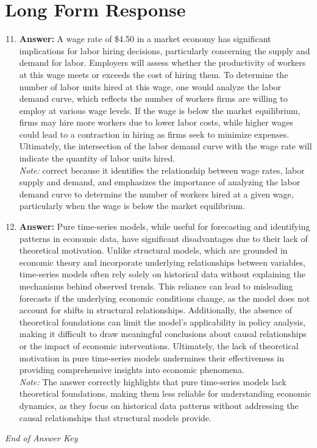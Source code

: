 \documentclass[12pt]{article}
\begin{document}
\section*{Long Form Response}
\begin{enumerate}[label=\arabic*.]
\setcounter{enumi}{10}
\item \textbf{Answer:} A wage rate of \$4.50 in a market economy has significant implications for labor hiring decisions, particularly concerning the supply and demand for labor. Employers will assess whether the productivity of workers at this wage meets or exceeds the cost of hiring them. To determine the number of labor units hired at this wage, one would analyze the labor demand curve, which reflects the number of workers firms are willing to employ at various wage levels. If the wage is below the market equilibrium, firms may hire more workers due to lower labor costs, while higher wages could lead to a contraction in hiring as firms seek to minimize expenses. Ultimately, the intersection of the labor demand curve with the wage rate will indicate the quantity of labor units hired.
\\ \textit{Note:} correct because it identifies the relationship between wage rates, labor supply and demand, and emphasizes the importance of analyzing the labor demand curve to determine the number of workers hired at a given wage, particularly when the wage is below the market equilibrium.
\item \textbf{Answer:} Pure time-series models, while useful for forecasting and identifying patterns in economic data, have significant disadvantages due to their lack of theoretical motivation. Unlike structural models, which are grounded in economic theory and incorporate underlying relationships between variables, time-series models often rely solely on historical data without explaining the mechanisms behind observed trends. This reliance can lead to misleading forecasts if the underlying economic conditions change, as the model does not account for shifts in structural relationships. Additionally, the absence of theoretical foundations can limit the model's applicability in policy analysis, making it difficult to draw meaningful conclusions about causal relationships or the impact of economic interventions. Ultimately, the lack of theoretical motivation in pure time-series models undermines their effectiveness in providing comprehensive insights into economic phenomena.
\\ \textit{Note:} The answer correctly highlights that pure time-series models lack theoretical foundations, making them less reliable for understanding economic dynamics, as they focus on historical data patterns without addressing the causal relationships that structural models provide.
\end{enumerate}

\vfill
\noindent\textit{End of Answer Key}
\end{document}
